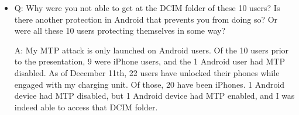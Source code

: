 \documentclass[11pt]{article} %
\begin{document}
\begin{itemize}
A: Researchers speculate that this type of attack has not been launched in any substantial form to date. In 2011, a Defcon participant presented a malicious charger at the hacking conference, and saw 360 self-labeled ``hackers'' use the charging station over the course of a week\footnote{Beware of Juice-Jacking, \url{http://krebsonsecurity.com/2011/08/beware-of-juice-jacking/}}. 

\item Q: Why were you not able to get at the DCIM folder of these 10 users? Is there another protection in Android that prevents you from doing so? Or were all these 10 users protecting themselves in some way?

A: My MTP attack is only launched on Android users. Of the 10 users prior to the presentation, 9 were iPhone users, and the 1 Android user had MTP disabled. As of December 11th, 22 users have unlocked their phones while engaged with my charging unit. Of those, 20 have been iPhones. 1 Android device had MTP disabled, but 1 Android device had MTP enabled, and I was indeed able to access that DCIM folder. 

\end{itemize} 
\end{document}
